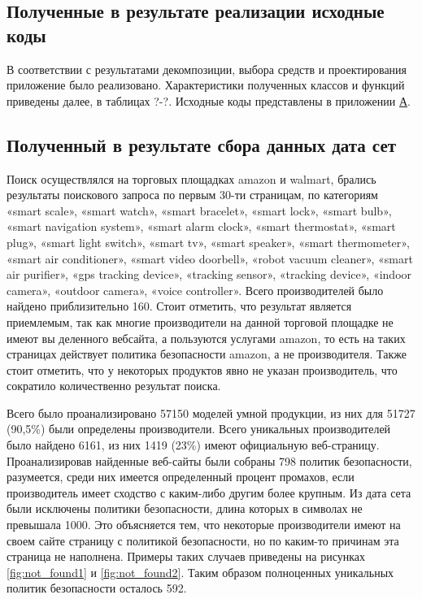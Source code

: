 \documentclass[../main]{subfiles}
\begin{document}
\subsection{Полученные в результате реализации исходные коды}
В соответствии с результатами декомпозиции, выбора средств и проектирования приложение было реализовано. Характеристики полученных классов и функций приведены далее, в таблицах ?-?. Исходные коды представлены в приложении \hyperref[sec:appendix]{А}.

\subsection{Полученный в результате сбора данных дата сет}
Поиск осуществлялся на торговых площадках amazon и walmart, брались результаты поискового запроса по первым 30-ти страницам, по категориям «smart scale», «smart watch», «smart bracelet», «smart lock», «smart bulb», «smart navigation system», «smart alarm clock», «smart thermostat», «smart plug», «smart light switch», «smart tv», «smart speaker», «smart thermometer», «smart air conditioner», «smart video doorbell», «robot vacuum cleaner», «smart air pu\-ri\-fi\-er», «gps tracking device», «tracking sensor», «tracking device», «indoor came\-ra», «outdoor camera», «voice controller». Всего производителей было найдено приблизительно 160. Стоит отметить, что результат является приемлемым, так как многие производители на данной торговой площадке не имеют вы деленного вебсайта, а пользуются услугами amazon, то есть на таких страницах действует политика безопасности amazon, а не производителя. Также стоит отметить, что у некоторых продуктов явно не указан производитель, что    сократило количественно результат поиска.

Всего было проанализировано 57150 моделей умной продукции, из них для 51727 (90,5\%) были определены производители. Всего уникальных производителей было найдено 6161, из них 1419 (23\%) имеют официальную веб-страницу. Проанализировав найденные веб-сайты были собраны 798 политик безопасности, разумеется, среди них имеется определенный процент промахов, если производитель имеет сходство с каким-либо другим более крупным. Из дата сета были исключены политики безопасности, длина которых в символах не превышала 1000. Это объясняется тем, что некоторые производители имеют на своем сайте страницу с политикой безопасности, но по каким-то причинам эта страница не наполнена. Примеры таких случаев приведены на рисунках \ref{fig:not_found1} и \ref{fig:not_found2}. Таким образом полноценных уникальных политик безопасности осталось 592.
\end{document}
